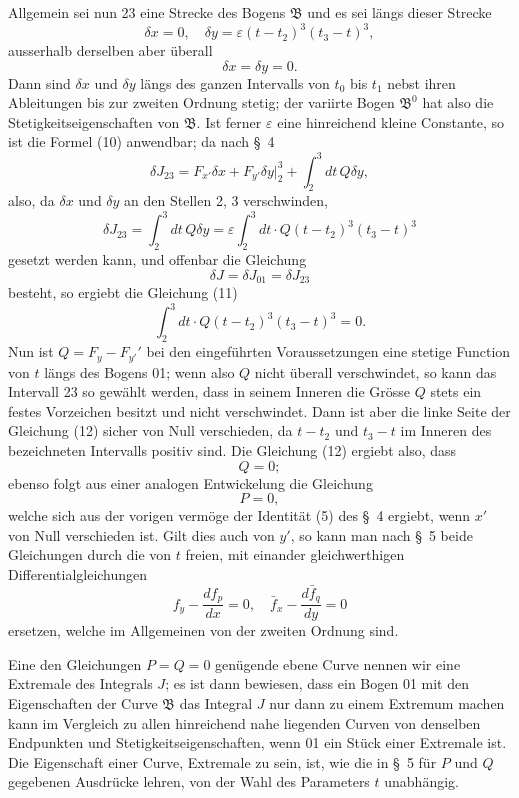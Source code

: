 \documentclass[11pt,a4paper,leqno]{article}
\begin{document}
Allgemein sei nun 23 eine Strecke des Bogens $\mathfrak{B}$ und es sei längs dieser Strecke
\[
\delta x=0,\quad \delta y=\varepsilon(t-t_2)^3(t_3-t)^3,
\]
ausserhalb derselben aber überall
\[
\delta x=\delta y=0.
\]
Dann sind $\delta x$ und $\delta y$ längs des ganzen Intervalls von $t_0$ bis $t_1$ nebst ihren Ableitungen bis zur zweiten Ordnung stetig; der variirte Bogen $\mathfrak{B}^0$ hat also die Stetigkeitseigenschaften von $\mathfrak{B}$. Ist ferner $\varepsilon$ eine hinreichend kleine Constante, so ist die Formel (10) anwendbar; da nach \S~4
\[
\delta J_{23}=F_{x'}\delta x+F_{y'}\delta y\bigg|_2^3+\int_2^3 dt\,Q\delta y,
\]
also, da $\delta x$ und $\delta y$ an den Stellen 2, 3 verschwinden,
\[
\delta J_{23}=\int_2^3 dt\,Q\delta y=\varepsilon\int_2^3 dt\cdot Q(t-t_2)^3(t_3-t)^3
\]
gesetzt werden kann, und offenbar die Gleichung
\[
\delta J=\delta J_{01}=\delta J_{23}
\]
besteht, so ergiebt die Gleichung (11)
\begin{equation}\tag{12}
\int_2^3 dt\cdot Q(t-t_2)^3(t_3-t)^3=0.
\end{equation}
Nun ist $Q=F_y-F_{y'}'$ bei den eingeführten Voraussetzungen eine stetige Function von $t$ längs des Bogens 01; wenn also $Q$ nicht überall verschwindet, so kann das Intervall 23 so gewählt werden, dass in seinem Inneren die Grösse $Q$ stets ein festes Vorzeichen besitzt und nicht verschwindet. Dann ist aber die linke Seite der Gleichung (12) sicher von Null verschieden, da $t-t_2$ und $t_3-t$ im Inneren des bezeichneten Intervalls positiv sind. Die Gleichung (12) ergiebt also, dass
\[
Q=0;
\]
ebenso folgt aus einer analogen Entwickelung die Gleichung
\[
P=0,
\]
welche sich aus der vorigen vermöge der Identität (5) des \S~4 ergiebt, wenn $x'$ von Null verschieden ist. Gilt dies auch von $y'$, so kann man nach \S~5 beide Gleichungen durch die von $t$ freien, mit einander gleichwerthigen Differentialgleichungen
\[
f_y-\frac{df_p}{dx}=0,\quad \bar f_x-\frac{d\bar f_q}{dy}=0
\]
ersetzen, welche im Allgemeinen von der zweiten Ordnung sind.

Eine den Gleichungen $P=Q=0$ genügende ebene Curve nennen wir eine Extremale des Integrals $J$; es ist dann bewiesen, dass ein Bogen 01 mit den Eigenschaften der Curve $\mathfrak{B}$ das Integral $J$ nur dann zu einem Extremum machen kann im Vergleich zu allen hinreichend nahe liegenden Curven von denselben Endpunkten und Stetigkeitseigenschaften, wenn 01 ein Stück einer Extremale ist. Die Eigenschaft einer Curve, Extremale zu sein, ist, wie die in \S~5 für $P$ und $Q$ gegebenen Ausdrücke lehren, von der Wahl des Parameters $t$ unabhängig.
\end{document}
